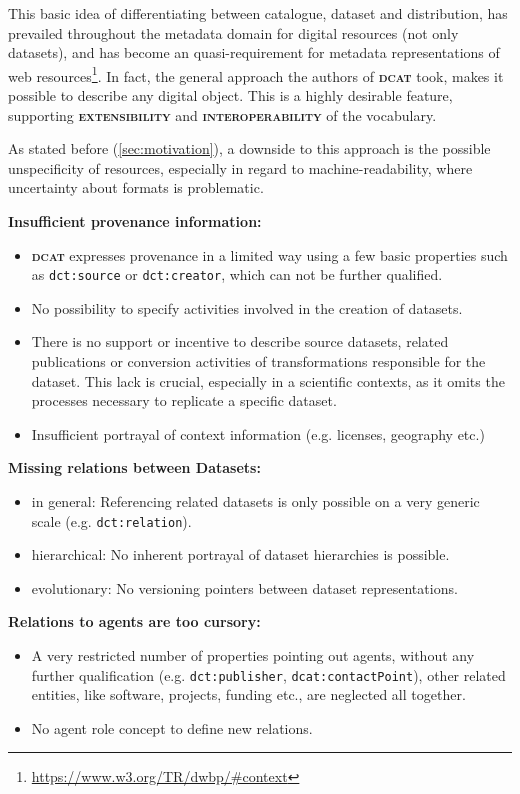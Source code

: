\documentclass[a4paper,english,twoside,BCOR1.5cm,headsepline,DIV12,appendixprefix,final,12pt]{scrbook}
\newcommand{\extensibility}{{\ttfamily\scshape\bfseries extensibility}\xspace}
\newcommand{\interoperability}{{\ttfamily\scshape\bfseries interoperability}\xspace}
\newcommand{\dcat}{{\scshape\bfseries dcat}\xspace}
\newcommand{\prop}[1]{{{\texttt{#1}}}}
\newcommand\footnoteurl[1]{\footnote{\scriptsize\url{#1}}}
\begin{document}
This basic idea of differentiating between catalogue, dataset and distribution, has prevailed throughout the metadata domain for digital resources (not only datasets), and has become an quasi-requirement for metadata representations of web resources\footnoteurl{https://www.w3.org/TR/dwbp/#context}. In fact, the general approach the authors of \dcat took, makes it possible to describe any digital object. This is a highly desirable feature, supporting \extensibility and \interoperability of the vocabulary.

As stated before (\cref{sec:motivation}), a downside to this approach is the possible unspecificity of resources, especially in regard to machine-readability, where uncertainty about formats is problematic.

\textbf{Insufficient provenance information:}
\begin{itemize}
\item \dcat expresses provenance in a limited way using a few basic properties such as
\prop{dct:source} or \prop{dct:creator}, which can not be further qualified.
\item No possibility to specify activities involved in the creation of datasets.
\item There is no support or incentive to describe source datasets, related publications or conversion activities of transformations responsible for the dataset. This lack is crucial, especially in a scientific contexts, as it omits the processes necessary to replicate a specific dataset.
\item Insufficient portrayal of context information (e.g. licenses, geography etc.)
\end{itemize}

\textbf{Missing relations between Datasets:}
\begin{itemize}
\item in general: Referencing related datasets is only possible on a very generic scale (e.g. \prop{dct:relation}).
\item hierarchical: No inherent portrayal of dataset hierarchies is possible.
\item evolutionary: No versioning pointers between dataset representations.
\end{itemize}

\textbf{Relations to agents are too cursory:}
\begin{itemize}
\item A very restricted number of properties pointing out agents, without any further qualification (e.g. \prop{dct:publisher}, \prop{dcat:contactPoint}), other related entities, like software, projects, funding etc., are neglected all together.
\item No agent role concept to define new relations.
\end{itemize}
\end{document}
